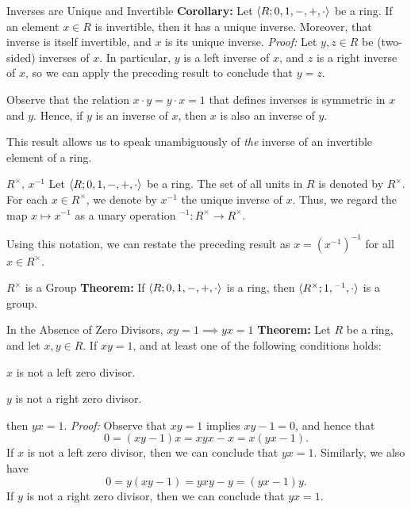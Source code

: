 \begin{thmbox}{Inverses are Unique and Invertible}
	\textbf{Corollary:} Let ${\langle {R; 0, 1, -, +, \cdot} \rangle}$ be a ring. If an element $x \in R$ is invertible, then it has a unique inverse. Moreover, that inverse is itself invertible, and $x$ is its unique inverse.
\tcblower
	\textit{Proof:} Let $y,z \in R$ be (two-sided) inverses of $x$. In particular, $y$ is a left inverse of $x$, and $z$ is a right inverse of $x$, so we can apply the preceding result to conclude that $y = z$.

	Observe that the relation $x \cdot y = y \cdot x = 1$ that defines inverses is symmetric in $x$ and $y$. Hence, if $y$ is an inverse of $x$, then $x$ is also an inverse of $y$.
\end{thmbox}

This result allows us to speak unambiguously of \textit{the} inverse of an invertible element of a ring.

\begin{dfnbox}{$R^\times$, $x^{-1}$}
	Let ${\langle {R; 0, 1, -, +, \cdot} \rangle}$ be a ring. The set of all units in $R$ is denoted by $R^\times$. For each $x \in R^\times$, we denote by $x^{-1}$ the unique inverse of $x$. Thus, we regard the map $x \mapsto x^{-1}$ as a unary operation ${}^{-1}: R^\times \to R^\times$.
\end{dfnbox}

Using this notation, we can restate the preceding result as $x = (x^{-1})^{-1}$ for all $x \in R^\times$.

\begin{thmbox}{$R^\times$ is a Group}
	\textbf{Theorem:} If ${\langle {R; 0, 1, -, +, \cdot} \rangle}$ is a ring, then ${\langle {R^\times; 1, {}^{-1}, \cdot} \rangle}$ is a group.
\end{thmbox}

\begin{thmbox}{In the Absence of Zero Divisors, $xy = 1 \implies yx = 1$}
	\textbf{Theorem:} Let $R$ be a ring, and let $x, y \in R$. If $xy = 1$, and at least one of the following conditions holds:
	\begin{dfnitems}
		\item $x$ is not a left zero divisor.
		\item $y$ is not a right zero divisor.
	\end{dfnitems}
	then $yx = 1$.
\tcblower
	\textit{Proof:} Observe that $xy = 1$ implies $xy - 1 = 0$, and hence that
	\[ 0 = (xy - 1)x = xyx - x = x(yx - 1). \]
	If $x$ is not a left zero divisor, then we can conclude that $yx = 1$. Similarly, we also have
	\[ 0 = y(xy - 1) = yxy - y = (yx - 1)y. \]
	If $y$ is not a right zero divisor, then we can conclude that $yx = 1$.
\end{thmbox}

